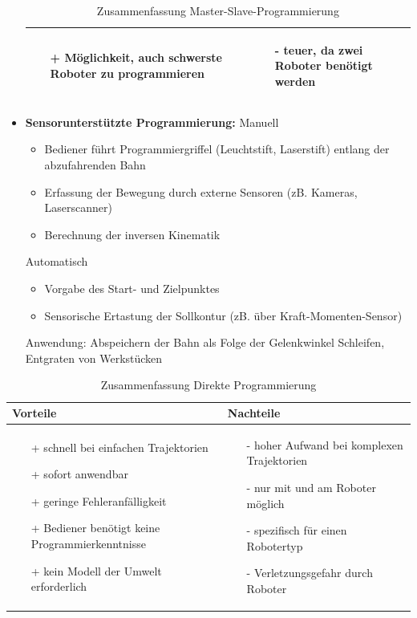 \documentclass[11pt]{scrartcl}
\begin{document}
\begin{itemize}
\begin{table}[hbt]
\begin{tabular}{|p{6.5cm}|p{6.5cm}|}
\begin{itemize}
\setlength\itemsep{0em}
\item[+] Möglichkeit, auch schwerste Roboter zu programmieren
\end{itemize}
 &
 \vspace{-5mm}
\begin{itemize}
\setlength\itemsep{0em}
\item[-] teuer, da zwei Roboter benötigt werden
\end{itemize}\\
\hline
\end{tabular}
\caption{Zusammenfassung Master-Slave-Programmierung}
\label{tab:MSprog}
\end{table}
\item \textbf{Sensorunterstützte Programmierung:}
Manuell
\begin{itemize}
\item Bediener führt Programmiergriffel (Leuchtstift, Laserstift) entlang der
abzufahrenden Bahn
\item Erfassung der Bewegung durch externe Sensoren (zB. Kameras,
Laserscanner)
\item Berechnung der inversen Kinematik
\end{itemize}
Automatisch
\begin{itemize}
\item Vorgabe des Start- und Zielpunktes
\item Sensorische Ertastung der Sollkontur (zB. über Kraft-Momenten-Sensor)
\end{itemize}
Anwendung: Abspeichern der Bahn als Folge der Gelenkwinkel
Schleifen, Entgraten von Werkstücken	
\end{itemize}
\begin{table}[hbt]
\centering
\begin{tabular}{|p{7.5cm}|p{7.5cm}|}
\hline
Vorteile & Nachteile\\
\hline
\vspace{-5mm}
\begin{itemize}
\setlength\itemsep{0em}
\item[+] schnell bei einfachen Trajektorien
\item[+] sofort anwendbar
\item[+] geringe Fehleranfälligkeit
\item[+] Bediener benötigt keine Programmierkenntnisse
\item[+] kein Modell der Umwelt erforderlich
\end{itemize}
 &
 \vspace{-5mm}
\begin{itemize}
\setlength\itemsep{0em}
\item[-] hoher Aufwand bei komplexen Trajektorien
\item[-] nur mit und am Roboter möglich
\item[-] spezifisch für einen Robotertyp
\item[-] Verletzungsgefahr durch Roboter
\end{itemize}\\
\hline
\end{tabular}
\caption{Zusammenfassung Direkte Programmierung}
\label{tab:dirprog}
\end{table}
\end{document}
